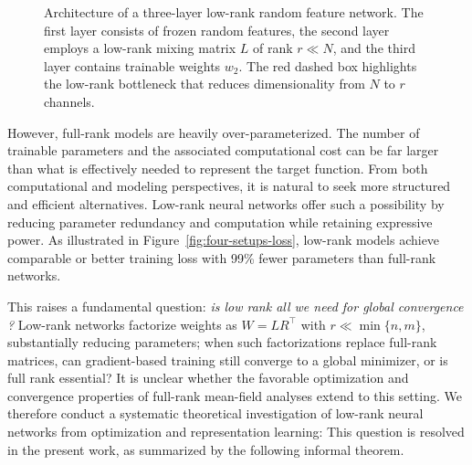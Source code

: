 \documentclass[nohyperref]{article}
\theoremstyle{plain}
\theoremstyle{definition}
\theoremstyle{remark}
\begin{document}
\begin{figure}[htbp]
{
    }
    \caption{Architecture of a three-layer low-rank random feature network. The first layer consists of frozen random features, the second layer employs a low-rank mixing matrix $L$ of rank $r \ll N$, and the third layer contains trainable weights $w_2$. The red dashed box highlights the low-rank bottleneck that reduces dimensionality from $N$ to $r$ channels.}
    \label{fig:architecture}
\end{figure}


However, full-rank models are heavily over-parameterized. The number of trainable parameters and the associated computational cost can be far larger than what is effectively needed to represent the target function. From both computational and modeling perspectives, it is natural to seek more structured and efficient alternatives. 
Low-rank neural networks offer such a possibility by reducing parameter redundancy and computation while retaining expressive power. 
As illustrated in Figure~\ref{fig:four-setups-loss}, low-rank models achieve comparable or better training loss with 99\% fewer parameters than full-rank networks.



This raises a fundamental question: \textit{is low rank all we need for global convergence ?} Low-rank networks factorize weights as $W=LR^{\top}$ with $r\ll\min\{n,m\}$, substantially reducing parameters; when such factorizations replace full-rank matrices, can gradient-based training still converge to a global minimizer, or is full rank essential? It is unclear whether the favorable optimization and convergence properties of full-rank mean-field analyses extend to this setting. We therefore conduct a systematic theoretical investigation of low-rank neural networks from optimization and representation learning: This question is resolved in the present work, as summarized by the following informal theorem.
\end{document}
